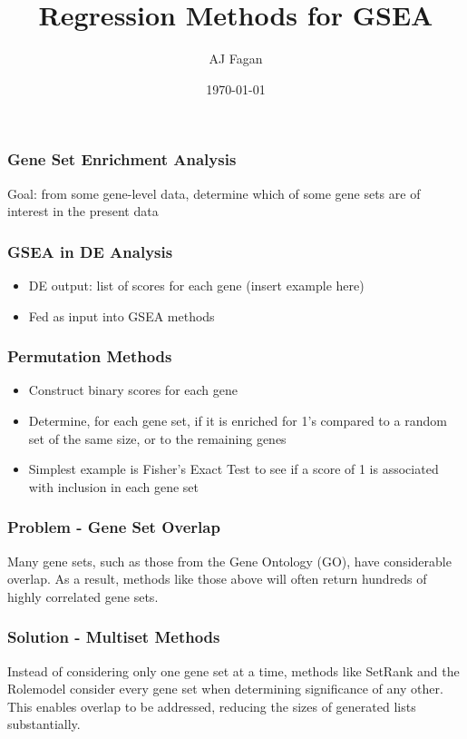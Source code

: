 \documentclass{beamer}
\title{Regression Methods for GSEA}
\date{\today}
\author{AJ Fagan}
\begin{document}
\maketitle

\begin{frame}
  \frametitle{Gene Set Enrichment Analysis}
  Goal: from some gene-level data, determine which of some gene sets are of interest in the present data
\end{frame}

\begin{frame}
  \frametitle{GSEA in DE Analysis} 

  \begin{itemize}
    \item DE output: list of scores for each gene (insert example here)
    \item Fed as input into GSEA methods 
  \end{itemize}
\end{frame}

\begin{frame}
  \frametitle{Permutation Methods}
  \begin{itemize}
    \item Construct binary scores for each gene
    \item Determine, for each gene set, if it is enriched for 1's compared to a random set of the same size, or to the remaining genes
    \item Simplest example is Fisher's Exact Test to see if a score of 1 is associated with inclusion in each gene set 
  \end{itemize} 
\end{frame} 

\begin{frame}
  \frametitle{Problem - Gene Set Overlap}

  Many gene sets, such as those from the Gene Ontology (GO), have considerable overlap.
  As a result, methods like those above will often return hundreds of highly correlated gene sets.
\end{frame}

\begin{frame}
  \frametitle{Solution - Multiset Methods}

  Instead of considering only one gene set at a time, methods like SetRank and the Rolemodel consider every gene set when determining significance of any other.
  This enables overlap to be addressed, reducing the sizes of generated lists substantially.
\end{frame}
\end{document}
